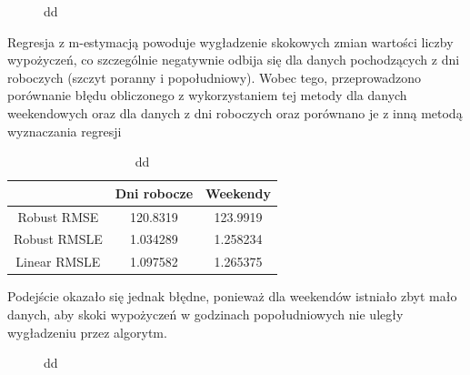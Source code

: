 \documentclass[a4paper,12pt]{article}
\begin{document}
    \begin{figure}[!htb]
        \center
        \caption{dd}
    \end{figure}
    
    Regresja z m-estymacją powoduje wygładzenie skokowych zmian wartości liczby wypożyczeń, co  szczególnie negatywnie odbija się dla danych pochodzących z dni roboczych (szczyt poranny i popołudniowy). Wobec tego, przeprowadzono porównanie błędu obliczonego z wykorzystaniem tej metody dla danych weekendowych oraz dla danych z dni roboczych oraz porównano je z inną metodą wyznaczania regresji

    \begin{table}
        \begin{tabular}{|c|c|c|}
                \hline
                & Dni robocze & Weekendy \\
                \hline
                Robust RMSE & 120.8319 & 123.9919 \\
                \hline
                Robust RMSLE & 1.034289 & 1.258234 \\
                \hline
                Linear RMSLE & 1.097582 & 1.265375 \\
                \hline
        \end{tabular}
        \caption{dd}
    \end{table}
    
    Podejście okazało się jednak błędne, ponieważ dla weekendów istniało zbyt mało danych, aby skoki wypożyczeń w godzinach popołudniowych nie uległy wygładzeniu przez algorytm.
    
    \begin{figure}[!htb]
        \center
        \caption{dd}
    \end{figure}
    
\end{document}
